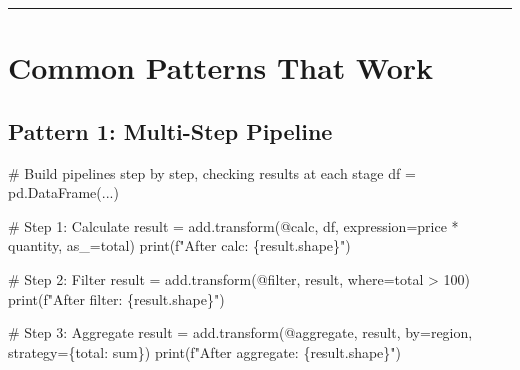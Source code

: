 \documentclass[
  letterpaper,
]{scrbook}
\newenvironment{Shaded}{\begin{snugshade}}{\end{snugshade}}
\newcommand{\BuiltInTok}[1]{\textcolor[rgb]{0.00,0.23,0.31}{#1}}
\newcommand{\CommentTok}[1]{\textcolor[rgb]{0.37,0.37,0.37}{#1}}
\newcommand{\NormalTok}[1]{\textcolor[rgb]{0.00,0.23,0.31}{#1}}
\newcommand{\OperatorTok}[1]{\textcolor[rgb]{0.37,0.37,0.37}{#1}}
\newcommand{\SpecialCharTok}[1]{\textcolor[rgb]{0.37,0.37,0.37}{#1}}
\newcommand{\SpecialStringTok}[1]{\textcolor[rgb]{0.13,0.47,0.30}{#1}}
\newcommand{\StringTok}[1]{\textcolor[rgb]{0.13,0.47,0.30}{#1}}
\begin{document}
\begin{center}\rule{0.5\linewidth}{0.5pt}\end{center}

\section{Common Patterns That Work}\label{common-patterns-that-work}

\subsection{Pattern 1: Multi-Step
Pipeline}\label{pattern-1-multi-step-pipeline}

\begin{Shaded}
\begin{Highlighting}[]
\CommentTok{\# Build pipelines step by step, checking results at each stage}
\NormalTok{df }\OperatorTok{=}\NormalTok{ pd.DataFrame(...)}

\CommentTok{\# Step 1: Calculate}
\NormalTok{result }\OperatorTok{=}\NormalTok{ add.transform(}\StringTok{\textquotesingle{}@calc\textquotesingle{}}\NormalTok{, df, expression}\OperatorTok{=}\StringTok{\textquotesingle{}price * quantity\textquotesingle{}}\NormalTok{, as\_}\OperatorTok{=}\StringTok{\textquotesingle{}total\textquotesingle{}}\NormalTok{)}
\BuiltInTok{print}\NormalTok{(}\SpecialStringTok{f"After calc: }\SpecialCharTok{\{}\NormalTok{result}\SpecialCharTok{.}\NormalTok{shape}\SpecialCharTok{\}}\SpecialStringTok{"}\NormalTok{)}

\CommentTok{\# Step 2: Filter}
\NormalTok{result }\OperatorTok{=}\NormalTok{ add.transform(}\StringTok{\textquotesingle{}@filter\textquotesingle{}}\NormalTok{, result, where}\OperatorTok{=}\StringTok{\textquotesingle{}total \textgreater{} 100\textquotesingle{}}\NormalTok{)}
\BuiltInTok{print}\NormalTok{(}\SpecialStringTok{f"After filter: }\SpecialCharTok{\{}\NormalTok{result}\SpecialCharTok{.}\NormalTok{shape}\SpecialCharTok{\}}\SpecialStringTok{"}\NormalTok{)}

\CommentTok{\# Step 3: Aggregate}
\NormalTok{result }\OperatorTok{=}\NormalTok{ add.transform(}\StringTok{\textquotesingle{}@aggregate\textquotesingle{}}\NormalTok{, result, by}\OperatorTok{=}\StringTok{\textquotesingle{}region\textquotesingle{}}\NormalTok{, }
\NormalTok{                       strategy}\OperatorTok{=}\NormalTok{\{}\StringTok{\textquotesingle{}total\textquotesingle{}}\NormalTok{: }\StringTok{\textquotesingle{}sum\textquotesingle{}}\NormalTok{\})}
\BuiltInTok{print}\NormalTok{(}\SpecialStringTok{f"After aggregate: }\SpecialCharTok{\{}\NormalTok{result}\SpecialCharTok{.}\NormalTok{shape}\SpecialCharTok{\}}\SpecialStringTok{"}\NormalTok{)}
\end{Highlighting}
\end{Shaded}
\end{document}
